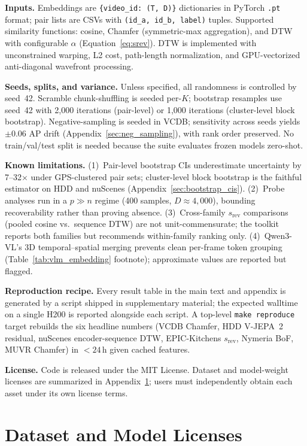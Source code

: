\documentclass{article}
\theoremstyle{remark}
\begin{document}
\textbf{Inputs.} Embeddings are \texttt{\{video\_id: (T, D)\}} dictionaries in PyTorch \texttt{.pt} format; pair lists are CSVs with \texttt{(id\_a, id\_b, label)} tuples. Supported similarity functions: cosine, Chamfer (symmetric-max aggregation), and DTW with configurable $\alpha$ (Equation~\ref{eq:srev}). DTW is implemented with unconstrained warping, L2 cost, path-length normalization, and GPU-vectorized anti-diagonal wavefront processing.

\textbf{Seeds, splits, and variance.} Unless specified, all randomness is controlled by seed~42. Scramble chunk-shuffling is seeded per-$K$; bootstrap resamples use seed~42 with 2{,}000 iterations (pair-level) or 1{,}000 iterations (cluster-level block bootstrap). Negative-sampling is seeded in VCDB; sensitivity across seeds yields $\pm0.06$ AP drift (Appendix~\ref{sec:neg_sampling}), with rank order preserved. No train/val/test split is needed because the suite evaluates frozen models zero-shot.

\textbf{Known limitations.} (1)~Pair-level bootstrap CIs underestimate uncertainty by 7--32$\times$ under GPS-clustered pair sets; cluster-level block bootstrap is the faithful estimator on HDD and nuScenes (Appendix~\ref{sec:bootstrap_cis}). (2)~Probe analyses run in a $p\gg n$ regime (400 samples, $D\approx4{,}000$), bounding recoverability rather than proving absence. (3)~Cross-family $s_\text{rev}$ comparisons (pooled cosine vs.\ sequence DTW) are not unit-commensurate; the toolkit reports both families but recommends within-family ranking only. (4)~Qwen3-VL's 3D temporal--spatial merging prevents clean per-frame token grouping (Table~\ref{tab:vlm_embedding} footnote); approximate values are reported but flagged.

\textbf{Reproduction recipe.} Every result table in the main text and appendix is generated by a script shipped in supplementary material; the expected walltime on a single H200 is reported alongside each script. A top-level \texttt{make reproduce} target rebuilds the six headline numbers (VCDB Chamfer, HDD V-JEPA~2 residual, nuScenes encoder-sequence DTW, EPIC-Kitchens $s_\text{rev}$, Nymeria BoF, MUVR Chamfer) in ${<}24$\,h given cached features.

\textbf{License.} Code is released under the MIT License. Dataset and model-weight licenses are summarized in Appendix~\ref{sec:licenses}; users must independently obtain each asset under its own license terms.

\section{Dataset and Model Licenses}
\label{sec:licenses}
\end{document}
